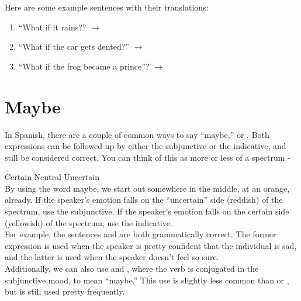 Here are some example sentences with their translations:

\begin{enumerate}[noitemsep]
	\item ``What if it rains?'' $\rightarrow$ 
	\item ``What if the car gets dented?'' $\rightarrow$ 
	\item ``What if the frog became a prince''? $\rightarrow$ 
\end{enumerate}


\section{Maybe}
\label{sec:maybe}
In Spanish, there are a couple of common ways to say ``maybe,''  or . Both expressions can be followed up by either the subjunctive or the indicative, and still be considered correct. You can think of this as more or less of a spectrum -


\begin{center}
\end{center}
Certain \hfill Neutral \hfill Uncertain\\ 
 
By using the word maybe, we start out somewhere in the middle, at an orange, already. If the speaker's emotion falls on the ``uncertain'' side (reddish) of the spectrum, use the subjunctive. If the speaker's emotion falls on the certain side (yellowish) of the spectrum, use the indicative. \\

For example, the sentences  and  are both grammatically correct. The former expression is used when the speaker is pretty confident that the individual is sad, and the latter is used when the speaker doesn't feel so sure. \\

Additionally, we can also use  and , where the verb is conjugated in the subjunctive mood, to mean ``maybe.'' This use is slightly less common than  or , but is still used pretty frequently. \\

